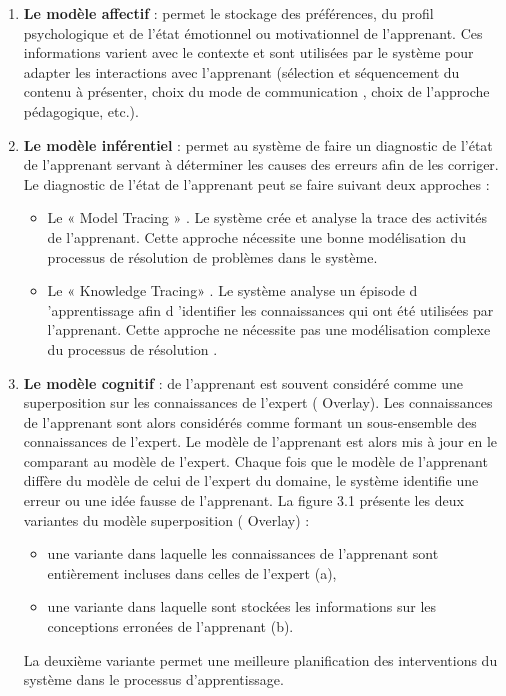 \begin{enumerate}
    \item \textbf{Le modèle affectif} :  permet le stockage des préférences, du profil psychologique et de l'état émotionnel ou motivationnel de l'apprenant. Ces informations varient avec le contexte et sont utilisées par le système pour adapter les interactions avec l'apprenant (sélection et séquencement du contenu à présenter, choix du mode de communication , choix de l'approche pédagogique, etc.).
    \item \textbf{Le modèle inférentiel} : permet au système de faire un diagnostic de l'état de l'apprenant servant à déterminer les causes des erreurs afin
de les corriger. Le diagnostic de l'état de l'apprenant peut se faire suivant deux
approches : 
    \begin{itemize}
        \item Le « Model Tracing » . Le système crée et analyse la trace des activités de l'apprenant. Cette approche nécessite une bonne modélisation du processus de résolution de problèmes dans le système. 
        \item Le « Knowledge Tracing» . Le système analyse un épisode d 'apprentissage afin d 'identifier les connaissances qui ont été utilisées par l'apprenant. Cette approche ne nécessite pas une modélisation complexe du processus de résolution . 
    \end{itemize}

    \item \textbf{Le modèle cognitif} : de l'apprenant est souvent considéré comme une superposition sur les connaissances de l'expert ( Overlay).
Les connaissances de l'apprenant sont alors considérés comme formant un sous-ensemble des connaissances de l'expert. Le modèle de l'apprenant est alors mis à jour en le comparant au modèle de l'expert. Chaque fois que le modèle de l'apprenant diffère du modèle de celui de l'expert du domaine, le système identifie une erreur ou une idée fausse de l'apprenant.
 La figure 3.1 présente les deux variantes du modèle superposition ( Overlay) : 
\begin{itemize}
\item une variante dans laquelle les connaissances de l'apprenant sont entièrement incluses dans celles de l'expert (a),
\item une variante dans laquelle sont stockées les informations sur les conceptions erronées de l'apprenant (b).
\end{itemize}
 La deuxième variante permet une meilleure planification des interventions du système dans le processus d'apprentissage. 
\end{enumerate}

